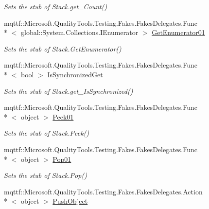 \begin{DoxyCompactItemize}
\begin{DoxyCompactList}\small\item\em Sets the stub of Stack.\-get\-\_\-\-Count()\end{DoxyCompactList}\item 
mqttf\-::\-Microsoft.\-Quality\-Tools.\-Testing.\-Fakes.\-Fakes\-Delegates.\-Func\\*
$<$ global\-::\-System.\-Collections.\-I\-Enumerator $>$ \hyperlink{class_system_1_1_collections_1_1_fakes_1_1_stub_stack_aef2bc51e4e5017460ec8bc7de0560b2a}{Get\-Enumerator01}
\begin{DoxyCompactList}\small\item\em Sets the stub of Stack.\-Get\-Enumerator()\end{DoxyCompactList}\item 
mqttf\-::\-Microsoft.\-Quality\-Tools.\-Testing.\-Fakes.\-Fakes\-Delegates.\-Func\\*
$<$ bool $>$ \hyperlink{class_system_1_1_collections_1_1_fakes_1_1_stub_stack_a203274e29ac8014d7d049b947282cc75}{Is\-Synchronized\-Get}
\begin{DoxyCompactList}\small\item\em Sets the stub of Stack.\-get\-\_\-\-Is\-Synchronized()\end{DoxyCompactList}\item 
mqttf\-::\-Microsoft.\-Quality\-Tools.\-Testing.\-Fakes.\-Fakes\-Delegates.\-Func\\*
$<$ object $>$ \hyperlink{class_system_1_1_collections_1_1_fakes_1_1_stub_stack_a12331080b5982d9da99beef048e7e0dd}{Peek01}
\begin{DoxyCompactList}\small\item\em Sets the stub of Stack.\-Peek()\end{DoxyCompactList}\item 
mqttf\-::\-Microsoft.\-Quality\-Tools.\-Testing.\-Fakes.\-Fakes\-Delegates.\-Func\\*
$<$ object $>$ \hyperlink{class_system_1_1_collections_1_1_fakes_1_1_stub_stack_a4d43fd587030b4868c87efc9520e82d5}{Pop01}
\begin{DoxyCompactList}\small\item\em Sets the stub of Stack.\-Pop()\end{DoxyCompactList}\item 
mqttf\-::\-Microsoft.\-Quality\-Tools.\-Testing.\-Fakes.\-Fakes\-Delegates.\-Action\\*
$<$ object $>$ \hyperlink{class_system_1_1_collections_1_1_fakes_1_1_stub_stack_aa415d19c5175c5ea2928d565d5c0005d}{Push\-Object}

\end{DoxyCompactItemize}

